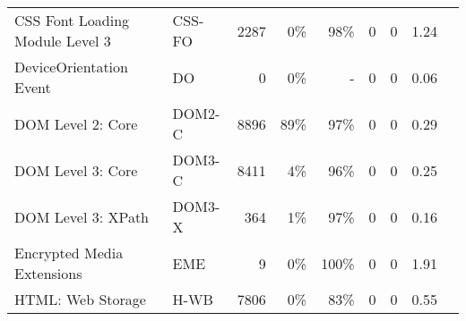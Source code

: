 \begin{table}[ht]
{\begin{tabular}{ l | l r r r | r r | r | l }
      CSS Font Loading Module Level 3                     &  CSS-FO      & 2287  & 0\%          & 98\%  & 0   & 0  & 1.24  & \cite{alaca2016device,acar2013fpdetective} \\ %
      DeviceOrientation Event                             &  DO          & 0     & 0\%          & -     & 0   & 0  & 0.06  & \cite{das2016tracking,alaca2016device} \\ %
      DOM Level 2: Core                                   &  DOM2-C      & 8896  & 89\%         & 97\%  & 0   & 0  & 0.29  & \\ %
      DOM Level 3: Core                                   &  DOM3-C      & 8411  & 4\%          & 96\%  & 0   & 0  & 0.25  & \\ %
      DOM Level 3: XPath                                  &  DOM3-X      & 364   & 1\%          & 97\%  & 0   & 0  & 0.16  & \\ %
      Encrypted Media Extensions                          &  EME         & 9     & 0\%          & 100\% & 0   & 0  & 1.91  & \\ %
      HTML: Web Storage                                   &  H-WB        & 7806  & 0\%          & 83\%  & 0   & 0  & 0.55  & \cite{alaca2016device,xu2015ucognito,ho2014tick} \\ %

\end{tabular}}
\end{table}
